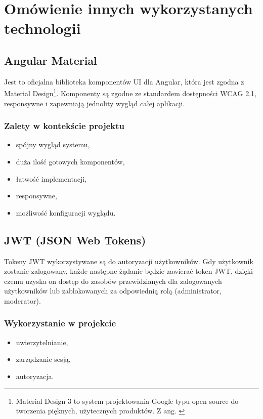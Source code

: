 \section{Omówienie innych wykorzystanych technologii}

\subsection{Angular Material}

Jest to oficjalna biblioteka komponentów UI dla Angular, która jest zgodna z Material Design\footnote{Material Design 3 to system projektowania Google typu open source do tworzenia pięknych, użytecznych produktów. Z ang. \cite{material_design}}.
Komponenty są zgodne ze standardem dostępności WCAG 2.1, responsywne i zapewniają jednolity wygląd całej aplikacji.

\subsubsection{Zalety w kontekście projektu}
\begin{itemize}
	\item spójny wygląd systemu,
	\item duża ilość gotowych komponentów,
	\item łatwość implementacji,
	\item responsywne,
	\item możliwość konfiguracji wyglądu.
\end{itemize}

\subsection{JWT (JSON Web Tokens)}

Tokeny JWT wykorzystywane są do autoryzacji użytkowników. Gdy użytkownik zostanie zalogowany, każde następne żądanie będzie zawierać token JWT, dzięki czemu uzyska on dostęp do zasobów przewidzianych dla zalogowanych użytkowników lub zablokowanych za odpowiednią rolą (administrator, moderator).

\subsubsection{Wykorzystanie w projekcie}

\begin{itemize}
	\item uwierzytelnianie,
	\item zarządzanie sesją,
	\item autoryzacja.
\end{itemize}

